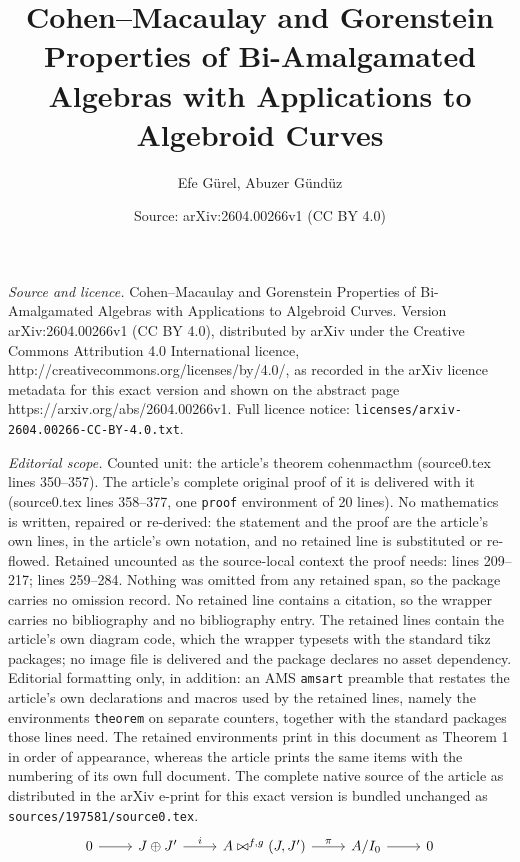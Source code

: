 \documentclass[10pt,a4paper]{amsart}
\title{Cohen--Macaulay and Gorenstein Properties of Bi-Amalgamated Algebras with Applications to Algebroid Curves}
\author{Efe G\"urel, Abuzer G\"und\"uz}
\date{Source: arXiv:2604.00266v1 (CC BY 4.0)}
\begin{document}
\maketitle

\noindent\emph{Source and licence.} Cohen--Macaulay and Gorenstein Properties of Bi-Amalgamated Algebras with Applications to Algebroid Curves. Version arXiv:2604.00266v1 (CC BY 4.0), distributed by arXiv under the Creative Commons Attribution 4.0 International licence, http://creativecommons.org/licenses/by/4.0/, as recorded in the arXiv licence metadata for this exact version and shown on the abstract page https://arxiv.org/abs/2604.00266v1. Full licence notice: \texttt{licenses/arxiv-2604.00266-CC-BY-4.0.txt}.\par\smallskip

\noindent\textit{Editorial scope.} Counted unit: the article's theorem cohenmacthm (source0.tex lines 350--357). The article's complete original proof of it is delivered with it (source0.tex lines 358--377, one \texttt{proof} environment of 20 lines). No mathematics is written, repaired or re-derived: the statement and the proof are the article's own lines, in the article's own notation, and no retained line is substituted or re-flowed.  Retained uncounted as the source-local context the proof needs: lines 209--217; lines 259--284.  Nothing was omitted from any retained span, so the package carries no omission record.  No retained line contains a citation, so the wrapper carries no bibliography and no bibliography entry.  The retained lines contain the article's own diagram code, which the wrapper typesets with the standard tikz packages; no image file is delivered and the package declares no asset dependency.  Editorial formatting only, in addition: an AMS \texttt{amsart} preamble that restates the article's own declarations and macros used by the retained lines, namely the environments \texttt{theorem} on separate counters, together with the standard packages those lines need.  The retained environments print in this document as Theorem 1 in order of appearance, whereas the article prints the same items with the numbering of its own full document.  The complete native source of the article as distributed in the arXiv e-print for this exact version is bundled unchanged as \texttt{sources/197581/source0.tex}.
\begin{equation}\label{exactseq}
    \begin{tikzcd}
	0 & {J\oplus J'} & {A\bowtie^{f,g}(J,J')} & {A/I_0} & 0
	\arrow[from=1-1, to=1-2]
	\arrow["i", from=1-2, to=1-3]
	\arrow["\pi", from=1-3, to=1-4]
	\arrow[from=1-4, to=1-5]
\end{tikzcd}
\end{equation}
\end{document}
